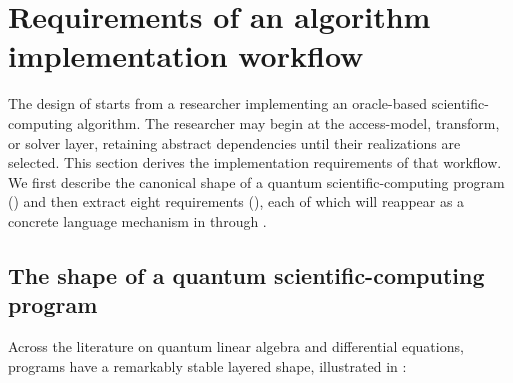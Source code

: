 \section{Requirements of an algorithm implementation workflow}
\label{sec:requirements}

The design of \pqlang{} starts from a researcher implementing an
oracle-based scientific-computing algorithm. The researcher may begin at
the access-model, transform, or solver layer, retaining abstract
dependencies until their realizations are selected. This section derives
the implementation requirements of that workflow.  We first describe the canonical shape of a quantum
scientific-computing program () and then extract
eight requirements (), each of which will
reappear as a concrete language mechanism in  through
.

\subsection{The shape of a quantum scientific-computing program}
\label{sec:qsc-structure}

Across the literature on quantum linear algebra and differential equations,
programs have a remarkably stable layered shape, illustrated in
:

